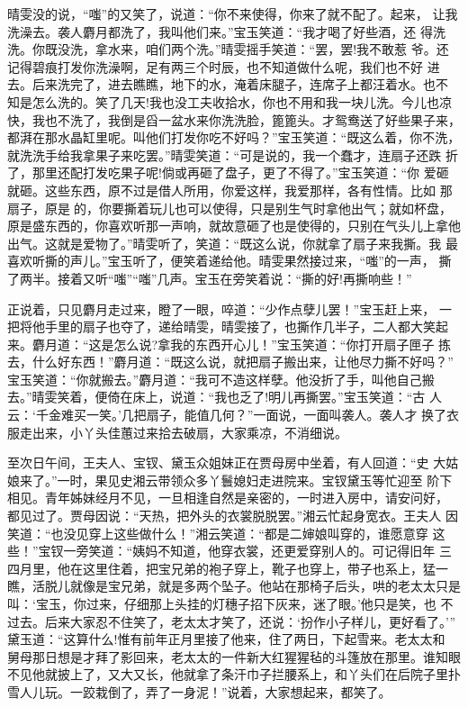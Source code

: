 晴雯没的说，“嗤”的又笑了，说道：“你不来使得，你来了就不配了。起来，
让我洗澡去。袭人麝月都洗了，我叫他们来。”宝玉笑道：“我才喝了好些酒，还
得洗洗。你既没洗，拿水来，咱们两个洗。”晴雯摇手笑道：“罢，罢!我不敢惹
爷。还记得碧痕打发你洗澡啊，足有两三个时辰，也不知道做什么呢，我们也不好
进去。后来洗完了，进去瞧瞧，地下的水，淹着床腿子，连席子上都汪着水。也不
知是怎么洗的。笑了几天!我也没工夫收拾水，你也不用和我一块儿洗。今儿也凉
快，我也不洗了，我倒是舀一盆水来你洗洗脸，篦篦头。才鸳鸯送了好些果子来，
都湃在那水晶缸里呢。叫他们打发你吃不好吗？”宝玉笑道：“既这么着，你不洗，
就洗洗手给我拿果子来吃罢。”晴雯笑道：“可是说的，我一个蠢才，连扇子还跌
折了，那里还配打发吃果子呢!倘或再砸了盘子，更了不得了。”宝玉笑道：“你
爱砸就砸。这些东西，原不过是借人所用，你爱这样，我爱那样，各有性情。比如
那扇子，原是的，你要撕着玩儿也可以使得，只是别生气时拿他出气；就如杯盘，
原是盛东西的，你喜欢听那一声响，就故意砸了也是使得的，只别在气头儿上拿他
出气。这就是爱物了。”晴雯听了，笑道：“既这么说，你就拿了扇子来我撕。我
最喜欢听撕的声儿。”宝玉听了，便笑着递给他。晴雯果然接过来，“嗤”的一声，
撕了两半。接着又听“嗤”“嗤”几声。宝玉在旁笑着说：“撕的好!再撕响些！”

正说着，只见麝月走过来，瞪了一眼，啐道：“少作点孽儿罢！”宝玉赶上来，
一把将他手里的扇子也夺了，递给晴雯，晴雯接了，也撕作几半子，二人都大笑起
来。麝月道：“这是怎么说?拿我的东西开心儿！”宝玉笑道：“你打开扇子匣子
拣去，什么好东西！”麝月道：“既这么说，就把扇子搬出来，让他尽力撕不好吗？”
宝玉笑道：“你就搬去。”麝月道：“我可不造这样孽。他没折了手，叫他自己搬
去。”晴雯笑着，便倚在床上，说道：“我也乏了!明儿再撕罢。”宝玉笑道：“古
人云：‘千金难买一笑。’几把扇子，能值几何？”一面说，一面叫袭人。袭人才
换了衣服走出来，小丫头佳蕙过来拾去破扇，大家乘凉，不消细说。

至次日午间，王夫人、宝钗、黛玉众姐妹正在贾母房中坐着，有人回道：“史
大姑娘来了。”一时，果见史湘云带领众多丫鬟媳妇走进院来。宝钗黛玉等忙迎至
阶下相见。青年姊妹经月不见，一旦相逢自然是亲密的，一时进入房中，请安问好，
都见过了。贾母因说：“天热，把外头的衣裳脱脱罢。”湘云忙起身宽衣。王夫人
因笑道：“也没见穿上这些做什么！”湘云笑道：“都是二婶娘叫穿的，谁愿意穿
这些！”宝钗一旁笑道：“姨妈不知道，他穿衣裳，还更爱穿别人的。可记得旧年
三四月里，他在这里住着，把宝兄弟的袍子穿上，靴子也穿上，带子也系上，猛一
瞧，活脱儿就像是宝兄弟，就是多两个坠子。他站在那椅子后头，哄的老太太只是
叫：‘宝玉，你过来，仔细那上头挂的灯穗子招下灰来，迷了眼。’他只是笑，也
不过去。后来大家忍不住笑了，老太太才笑了，还说：‘扮作小子样儿，更好看了。’”
黛玉道：“这算什么!惟有前年正月里接了他来，住了两日，下起雪来。老太太和
舅母那日想是才拜了影回来，老太太的一件新大红猩猩毡的斗篷放在那里。谁知眼
不见他就披上了，又大又长，他就拿了条汗巾子拦腰系上，和丫头们在后院子里扑
雪人儿玩。一跤栽倒了，弄了一身泥！”说着，大家想起来，都笑了。

